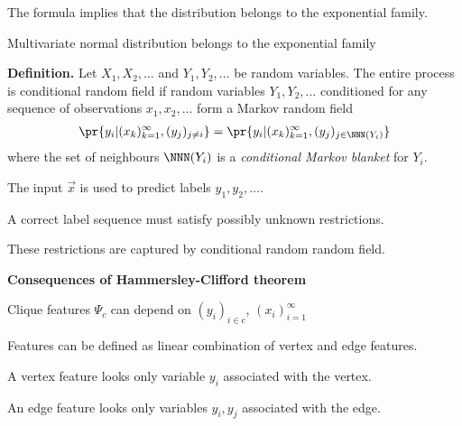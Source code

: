 \documentclass[landscape,footrule]{foils}
\begin{document}
The formula implies that the distribution belongs to the exponential family.

\begin{triangles}
\item Multivariate normal distribution belongs to the exponential family
\end{triangles}




\textbf{Definition.}
Let $X_1,X_2,\ldots$ and $Y_1,Y_2,\ldots$ be random variables. The entire process is conditional random field if random variables $Y_1,Y_2,\ldots$ conditioned for any sequence of observations $x_1,x_2,\ldots$ form a Markov random field
\begin{align*}
\pr{y_i|(x_k)_{k=1}^\infty, (y_j)_{j\neq i}}=\pr{y_i|(x_k)_{k=1}^\infty, (y_j)_{j\in\NNN(Y_i)} }
\end{align*}
where the set of neighbours $\NNN(Y_i)$ is a \emph{conditional Markov blanket} for $Y_i$. 



\enlargethispage{1cm}


\begin{triangles}
\item The input $\vec{x}$ is used to predict labels $y_1,y_2,\ldots$.
\item A correct label sequence must satisfy possibly unknown restrictions.
\item These restrictions are captured by conditional random random field.
\end{triangles}\vspace*{0.5cm}


\textbf{Consequences of Hammersley-Clifford theorem}
\begin{triangles}
\item Clique features $\Psi_c$ can depend on $(y_i)_{i\in c}$, $(x_i)_{i=1}^\infty$ 
\item Features can be defined as linear combination of vertex and edge features.
\item A vertex feature looks only variable $y_i$ associated with the vertex.
\item An edge feature looks only variables $y_i, y_j$ associated with the edge.
\end{triangles}
\end{document}
